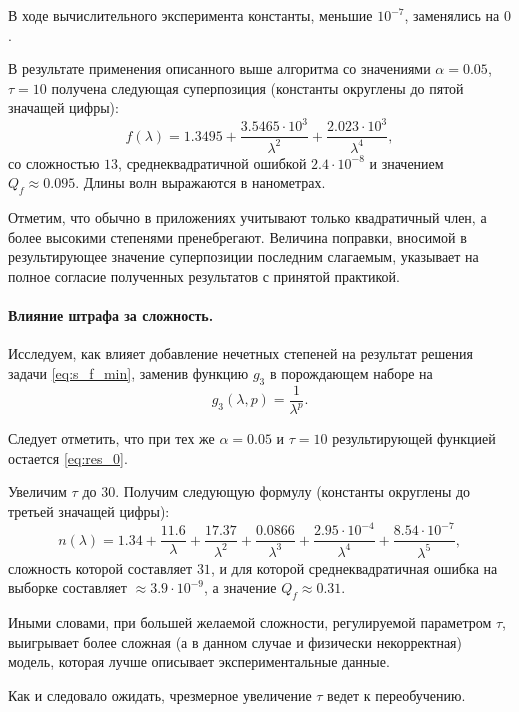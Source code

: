 \documentclass[11pt,a4paper]{article}
\theoremstyle{definition}
\begin{document}
В ходе вычислительного эксперимента константы, меньшие $10^{-7}$,
заменялись на $0$.

В результате применения описанного выше алгоритма со значениями
$\alpha = 0.05$, $\tau = 10$ получена следующая суперпозиция
(константы округлены до пятой значащей цифры):
\begin{equation}
  f(\lambda) = 1.3495 + \frac{3.5465 \cdot 10^3}{\lambda^2} + \frac{2.023 \cdot 10^3}{\lambda^4},
  \label{eq:res_0}
\end{equation}
со сложностью $13$, среднеквадратичной ошибкой $2.4 \cdot 10^{-8}$ и значением $Q_f \approx 0.095$.
Длины волн выражаются в нанометрах.

Отметим, что обычно в приложениях учитывают только квадратичный член, а более
высокими степенями пренебрегают. Величина поправки, вносимой в результирующее значение
суперпозиции последним слагаемым, указывает на полное согласие полученных результатов
с принятой практикой.

\paragraph{Влияние штрафа за сложность.}

Исследуем, как влияет добавление нечетных степеней на результат решения задачи \eqref{eq:s_f_min},
заменив функцию $g_3$ в порождающем наборе на
\[
  g_3(\lambda, p) = \frac{1}{\lambda^p}.
\]

Следует отметить, что при тех же $\alpha = 0.05$ и $\tau = 10$ результирующей функцией остается
\eqref{eq:res_0}.

Увеличим $\tau$ до 30. Получим следующую формулу (константы округлены до третьей значащей цифры):
\begin{equation}
  n(\lambda) = 1.34 + \frac{11.6}{\lambda} + \frac{17.37}{\lambda^2} + \frac{0.0866}{\lambda^3} + \frac{2.95 \cdot 10^{-4}}{\lambda^4} + \frac{8.54 \cdot 10^{-7}}{\lambda^5},
  \label{eq:res_incorrect}
\end{equation}
сложность которой составляет $31$, и для которой среднеквадратичная ошибка
на выборке составляет $\approx 3.9 \cdot 10^{-9}$,
а значение $Q_f \approx 0.31$.

Иными словами, при большей желаемой сложности,
регулируемой параметром $\tau$, выигрывает более сложная (а в данном случае и
физически некорректная) модель, которая лучше описывает экспериментальные данные.

Как и следовало ожидать, чрезмерное увеличение $\tau$ ведет к переобучению.
\end{document}
